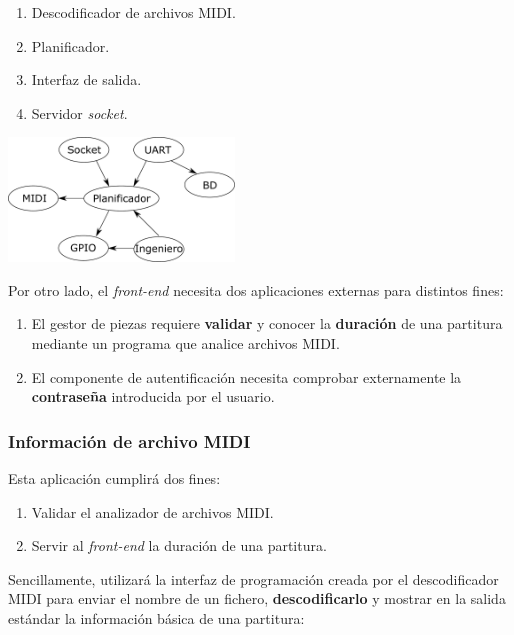 \documentclass[10pt,a4paper]{article}
\begin{document}
	\begin{multicols}{2}
		\begin{enumerate}[nosep,itemsep=1em]
			\item Descodificador de archivos MIDI.
			\item Planificador.
			\item Interfaz de salida.
			\item Servidor \textit{socket}.
		\end{enumerate}
		\columnbreak
		\begin{center}
			\includegraphics[width=0.45\textwidth]{images/daemon} 
		\end{center}
	\end{multicols}
	
	Por otro lado, el \textit{front-end} necesita dos aplicaciones externas para distintos fines:
	
	\begin{enumerate}
		\item El gestor de piezas requiere \textbf{validar} y conocer la \textbf{duración} de una partitura mediante un programa que analice archivos MIDI.
		
		\item El componente de autentificación necesita comprobar externamente la \textbf{contraseña} introducida por el usuario.
	\end{enumerate}
	
	\subsubsection*{Información de archivo MIDI}
	
	Esta aplicación cumplirá dos fines:
	
	\begin{enumerate}
		\item Validar el analizador de archivos MIDI.
		\item Servir al \textit{front-end} la duración de una partitura.
	\end{enumerate}
	
	Sencillamente, utilizará la interfaz de programación creada por el descodificador MIDI para enviar el nombre de un fichero, \textbf{descodificarlo} y mostrar en la salida estándar la información básica de una partitura:
	
\end{document}
